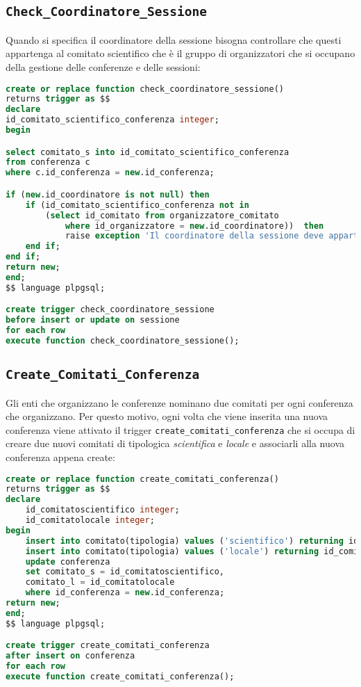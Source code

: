 \subsection{\texttt{Check\_Coordinatore\_Sessione}}
Quando si specifica il coordinatore della sessione bisogna controllare che questi appartenga al comitato scientifico che è il gruppo di organizzatori che si occupano della gestione delle conferenze e delle sessioni:
\begin{lstlisting}[caption={check\_coordinatore\_sessione}, language=sql, style=mystyle]
create or replace function check_coordinatore_sessione() 
returns trigger as $$
declare 
id_comitato_scientifico_conferenza integer;
begin

select comitato_s into id_comitato_scientifico_conferenza
from conferenza c
where c.id_conferenza = new.id_conferenza;

if (new.id_coordinatore is not null) then
	if (id_comitato_scientifico_conferenza not in 
		(select id_comitato from organizzatore_comitato 
			where id_organizzatore = new.id_coordinatore))  then
			raise exception 'Il coordinatore della sessione deve appartenere al comitato scientifico della conferenza';
	end if;
end if;
return new;
end;
$$ language plpgsql;

create trigger check_coordinatore_sessione
before insert or update on sessione
for each row
execute function check_coordinatore_sessione();
\end{lstlisting}
\subsection{\texttt{Create\_Comitati\_Conferenza}}
Gli enti che organizzano le conferenze nominano due comitati per ogni conferenza che organizzano. Per questo motivo, ogni volta che viene inserita una nuova conferenza viene attivato il trigger \texttt{create\_comitati\_conferenza} che si occupa di creare due nuovi comitati di tipologica \textit{scientifica} e \textit{locale} e associarli alla nuova conferenza appena create:
\begin{lstlisting}[language=SQL, style=mystyle, caption={\texttt{create\_comitati\_conferenza}}]
create or replace function create_comitati_conferenza() 
returns trigger as $$
declare 
	id_comitatoscientifico integer;
	id_comitatolocale integer;
begin
	insert into comitato(tipologia) values ('scientifico') returning id_comitato into id_comitatoscientifico;
	insert into comitato(tipologia) values ('locale') returning id_comitato into id_comitatolocale;
	update conferenza 
	set comitato_s = id_comitatoscientifico, 
	comitato_l = id_comitatolocale 
	where id_conferenza = new.id_conferenza;
return new;
end;
$$ language plpgsql;

create trigger create_comitati_conferenza
after insert on conferenza
for each row
execute function create_comitati_conferenza();	
\end{lstlisting}
